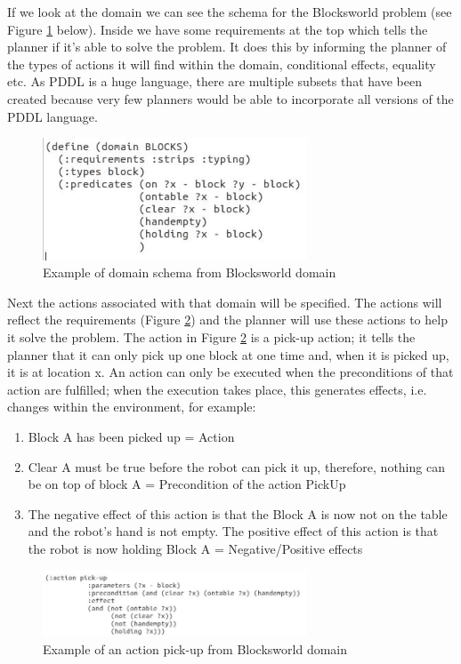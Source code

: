 If we look at the domain we can see the schema for the Blocksworld problem (see Figure \ref{fig:Blocksworld Domain} below). Inside we have some requirements at the top which tells the planner if it's able to solve the problem. It does this by informing the planner of the types of actions it will find within the domain, conditional effects, equality etc. As PDDL is a huge language, there are multiple subsets that have been created because very few planners would be able to incorporate all versions of the PDDL language. 
\begin{figure}[!htb]
    \centering
    \includegraphics[scale=1.8,width=0.70\textwidth]{BlocksworldDomain1.jpg}
    \caption{Example of domain schema from Blocksworld domain}
    \label{fig:Blocksworld Domain}
\end{figure}

Next the actions associated with that domain will be specified. The actions will reflect the requirements (Figure \ref{fig:Blocksworld Pick-up Action}) and the planner will use these actions to help it solve the problem.
The action in Figure \ref{fig:Blocksworld Pick-up Action} is a pick-up action; it tells the planner that it can only pick up one block at one time and, when it is picked up, it is at location x. An action can only be executed when the preconditions of that action are fulfilled; when the execution takes place, this generates effects, i.e. changes within the environment, for example:
\begin{enumerate}
\item Block A has been picked up = Action
\item Clear A must be true before the robot can pick it up, therefore, nothing can be on top of block A = Precondition of the action PickUp
\item The negative effect of this action is that the Block A is now not on the table and the robot's hand is not empty. The positive effect of this action is that the robot is now holding Block A = Negative/Positive effects 
\end{enumerate} 
\begin{figure}[!htb]
    \centering
    \includegraphics[scale=2.0,width=0.70\textwidth]{BlocksworldDomainAction.jpg}
    \caption{Example of an action pick-up from Blocksworld domain}
    \label{fig:Blocksworld Pick-up Action}
\end{figure}

